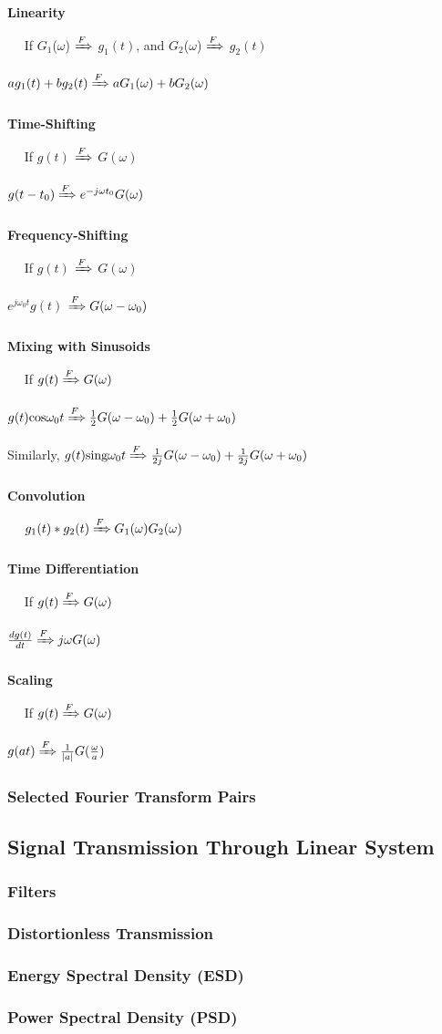 \documentclass[11pt]{article}
\DeclarePairedDelimiter{\abs}{\lvert}{\rvert}
\begin{document}
\textbf{Linearity} 
\hfill \break \par $\quad$ If $G_1$($\omega$) $\xRightarrow{F}$ $g_1(t)$, and $G_2$($\omega$) $\xRightarrow{F}$ $g_2(t)$ \par 
\quad $ag_1(t) + bg_2(t) \xRightarrow{F} aG_1(\omega) + bG_2(\omega)$ \\ \\
\textbf{Time-Shifting} 
\hfill \break \par $\quad$ If $g(t)$ $\xRightarrow{F}$ $G(\omega)$ 
\par \quad $g(t-t_0) \xRightarrow{F} e^{-j\omega t_0}G(\omega)$ \\ \\ 
\textbf{Frequency-Shifting} 
\hfill \break \par $\quad$ If $g(t)$ $\xRightarrow{F}$ $G(\omega)$ 
\par \quad $e^{j\omega_0t} g(t)$ $\xRightarrow{F} G(\omega - \omega_0)$  \\ \\
\textbf{Mixing with Sinusoids} 
\hfill \break \par $\quad$ 
If $g(t) \xRightarrow{F} G(\omega)$
\par \quad
$g(t)\text{cos}\omega_0t \xRightarrow{F} \frac{1}{2}G(\omega - \omega_0) + \frac{1}{2}G(\omega + \omega_0)$
\par \quad
Similarly, $g(t)\text{sing}\omega_0t \xRightarrow{F} \frac{1}{2j}G(\omega - \omega_0) + \frac{1}{2j}G(\omega + \omega_0)$ 
\\ \\
\textbf{Convolution}
\hfill \break \par $\quad$ 
$g_1(t) * g_2(t) \xRightarrow{F} G_1(\omega)G_2(\omega)$
\\ \\
\textbf{Time Differentiation}
\hfill \break \par $\quad$
If $g(t) \xRightarrow{F} G(\omega)$
\par \quad
$\frac{dg(t)}{dt} \xRightarrow{F} j\omega G(\omega)$ \\ \\ 
\textbf{Scaling}
\hfill \break \par $\quad$ 
If $g(t) \xRightarrow{F} G(\omega)$
\par \quad
$g(at) \xRightarrow{F} \frac{1}{\abs{a}}G(\frac{\omega}{a})$

\subsubsection{Selected Fourier Transform Pairs}
\subsection{Signal Transmission Through Linear System}
\subsubsection{Filters}
\subsubsection{Distortionless Transmission}
\subsubsection{Energy Spectral Density (ESD)}
\subsubsection{Power Spectral Density (PSD)}
\end{document}
